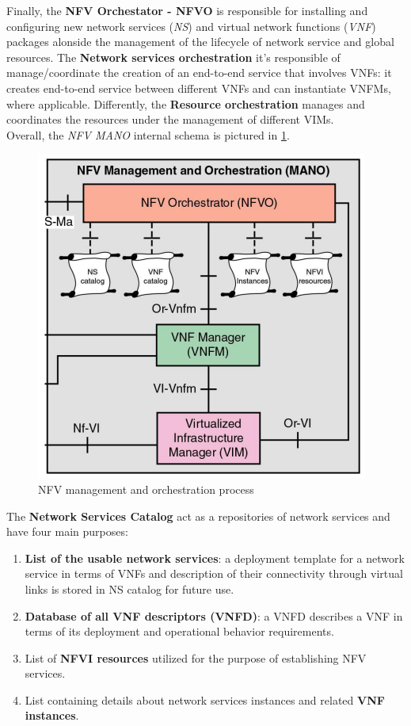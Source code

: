 \documentclass[10pt,a4paper]{report}
\theoremstyle{definition}
\begin{document}
Finally, the \textbf{NFV Orchestator - NFVO} is responsible for installing and configuring new network services (\textit{NS}) and virtual network functions (\textit{VNF}) packages alonside the management of the lifecycle of network service and global resources.
The \textbf{Network services orchestration} it's responsible of manage/coordinate the creation of an end-to-end service that involves VNFs: it creates end-to-end service between different VNFs  and can instantiate VNFMs, where applicable.
Differently, the \textbf{Resource orchestration} manages and coordinates the resources under the management of different VIMs.\\
Overall, the \textit{NFV MANO} internal schema is pictured in \ref{mano-inside}. 
\begin{figure}[h]
	\centering\includegraphics[scale=0.50]{images/Pasted image 20230409203617.png}
	\caption{NFV management and orchestration process}
	\label{mano-inside}
\end{figure}
The \textbf{Network Services Catalog} act as a repositories of network services and have four main purposes:
\begin{enumerate}
	\item 
	\textbf{List of the usable network services}: a deployment template for a network service in terms of VNFs and description of their connectivity through virtual links is stored in NS catalog for future use.
	\item 
	\textbf{Database of all VNF descriptors (VNFD)}: a VNFD describes a VNF in terms of its deployment and operational behavior requirements.
	\item 
	List of \textbf{NFVI resources} utilized for the purpose of establishing NFV services.
	\item 
	List containing details about network services instances and related \textbf{VNF instances}.
\end{enumerate}
\end{document}
